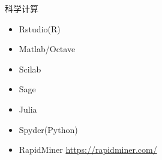 \documentclass[aspectratio=169]{beamer}
\begin{document}
\begin{frame}[label={sec:orgf46e2d4}]{科学计算}
\begin{itemize}
\item Rstudio(R)
\item Matlab/Octave
\item Scilab
\item Sage
\item Julia
\item Spyder(Python)
\item RapidMiner \url{https://rapidminer.com/}
\end{itemize}
\end{frame}
\end{document}
